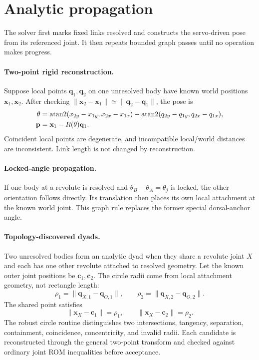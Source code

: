 \documentclass[11pt]{article}
\begin{document}
\section{Analytic propagation}

The solver first marks fixed links resolved and constructs the servo-driven
pose from its referenced joint. It then repeats bounded graph passes until no
operation makes progress.

\paragraph{Two-point rigid reconstruction.}
Suppose local points $\mathbf{q}_1,\mathbf{q}_2$ on one unresolved body have
known world positions $\mathbf{x}_1,\mathbf{x}_2$. After checking
$\|\mathbf{x}_2-\mathbf{x}_1\|\simeq
 \|\mathbf{q}_2-\mathbf{q}_1\|$, the pose is
\begin{align}
  \theta &={\rm atan2}(x_{2y}-x_{1y},x_{2x}-x_{1x})
           -{\rm atan2}(q_{2y}-q_{1y},q_{2x}-q_{1x}),\\
  \mathbf{p}&=\mathbf{x}_1-R(\theta)\mathbf{q}_1.
\end{align}
Coincident local points are degenerate, and incompatible local/world distances
are inconsistent. Link length is not changed by reconstruction.

\paragraph{Locked-angle propagation.}
If one body at a revolute is resolved and
$\theta_B-\theta_A=\bar\theta_j$ is locked, the other orientation follows
directly. Its translation then places its own local attachment at the known
world joint. This graph rule replaces the former special dorsal-anchor angle.

\paragraph{Topology-discovered dyads.}
Two unresolved bodies form an analytic dyad when they share a revolute joint
$X$ and each has one other revolute attached to resolved geometry. Let the
known outer joint positions be $\mathbf{c}_1,\mathbf{c}_2$. The circle radii
come from local attachment geometry, not rectangle length:
\begin{equation}
  \rho_1=\|\mathbf{q}_{X,1}-\mathbf{q}_{O,1}\|,
  \qquad
  \rho_2=\|\mathbf{q}_{X,2}-\mathbf{q}_{O,2}\|.
\end{equation}
The shared point satisfies
\begin{equation}
  \|\mathbf{x}_X-\mathbf{c}_1\|=\rho_1,
  \qquad
  \|\mathbf{x}_X-\mathbf{c}_2\|=\rho_2.
\end{equation}
The robust circle routine distinguishes two intersections, tangency, separation,
containment, coincidence, concentricity, and invalid radii. Each candidate is
reconstructed through the general two-point transform and checked against
ordinary joint ROM inequalities before acceptance.
\end{document}
